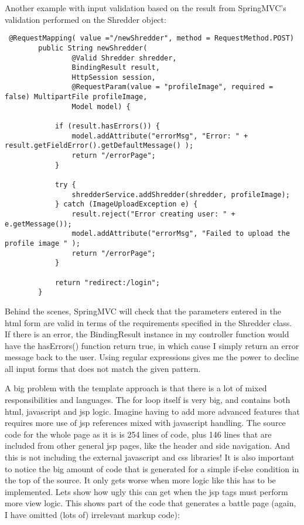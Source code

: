 Another example with input validation based on the result from SpringMVC's validation performed on the Shredder object:

\begin{lstlisting}
 @RequestMapping( value ="/newShredder", method = RequestMethod.POST)
		public String newShredder( 
				@Valid Shredder shredder,
				BindingResult result,
				HttpSession session,
				@RequestParam(value = "profileImage", required = false) MultipartFile profileImage,
				Model model) {
				
			if (result.hasErrors()) {
				model.addAttribute("errorMsg", "Error: " + result.getFieldError().getDefaultMessage() );
				return "/errorPage";
			}
	
			try {
				shredderService.addShredder(shredder, profileImage);
			} catch (ImageUploadException e) {
				result.reject("Error creating user: " + e.getMessage());
				model.addAttribute("errorMsg", "Failed to upload the profile image " );
				return "/errorPage";
			}
			
			return "redirect:/login";
		}
\end{lstlisting}

Behind the scenes, SpringMVC will check that the parameters entered in the html form are valid in terms of the requirements specified in the Shredder class. If there is an error, the BindingResult instance in my controller function would have the hasErrors() function return true, in which         cause I simply return an error message back to the user. Using 
        regular expressions gives me the power to decline all input
        forms that does not match the given pattern. 










  A big problem with the template approach is that
                  there is a lot of mixed responsibilities and
                  languages. The for loop itself is very big, and
                  contains both html, javascript and jsp
                  logic. Imagine having to add more advanced features
                  that requires more use of jsp references mixed with
                  javascript handling. The source code for the whole
                  page as it is is 254 lines of code, plus 146 lines
                  that are included from other general jsp pages, like
                  the header and side navigation. And this is not
                  including the external javascript and css libraries!
                  It is also important to notice the big amount of
                  code that is generated for a simple if-else
                  condition in the top of the source. It only gets
                  worse when more logic like this has to be
                  implemented. Lets show how ugly this can get when
                  the jsp tags must perform more view logic. This
                  shows part of the code that generates a battle page
                  (again, I have omitted (lots of) irrelevant markup
                  code): 
		  
